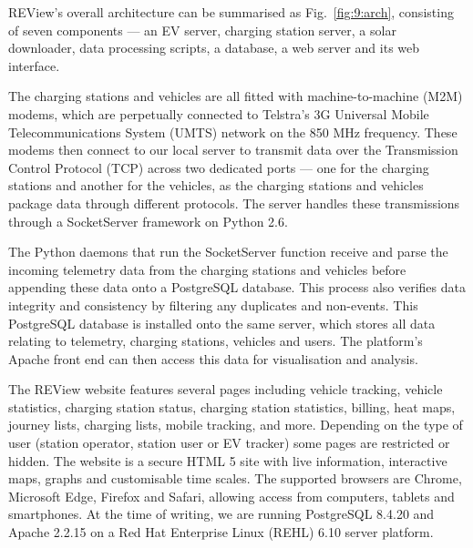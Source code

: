 REView’s overall architecture can be summarised as Fig.~\ref{fig:9:arch}, consisting of seven components --- an EV server, charging station server, a solar downloader, data processing scripts, a database, a web server and its web interface. 

The charging stations and vehicles are all fitted with machine-to-machine (M2M) modems, which are perpetually connected to Telstra’s 3G Universal Mobile Telecommunications System (UMTS) network on the 850 MHz frequency. These modems then connect to our local server to transmit data over the Transmission Control Protocol (TCP) across two dedicated ports --- one for the charging stations and another for the vehicles, as the charging stations and vehicles package data through different protocols. The server handles these transmissions through a SocketServer framework on Python 2.6.


The Python daemons that run the SocketServer function receive and parse the incoming telemetry data from the charging stations and vehicles before appending these data onto a PostgreSQL database. This process also verifies data integrity and consistency by filtering any duplicates and non-events. This PostgreSQL database is installed onto the same server, which stores all data relating to telemetry, charging stations, vehicles and users. The platform’s Apache front end can then access this data for visualisation and analysis. 

The REView website features several pages including vehicle tracking, vehicle statistics, charging station status, charging station statistics, billing, heat maps, journey lists, charging lists, mobile tracking, and more. Depending on the type of user (station operator, station user or EV tracker) some pages are restricted or hidden. The website is a secure HTML 5 site with live information, interactive maps, graphs and customisable time scales. The supported browsers are Chrome, Microsoft Edge, Firefox and Safari, allowing access from computers, tablets and smartphones. At the time of writing, we are running PostgreSQL 8.4.20 and Apache 2.2.15 on a Red Hat Enterprise Linux (REHL) 6.10 server platform.


